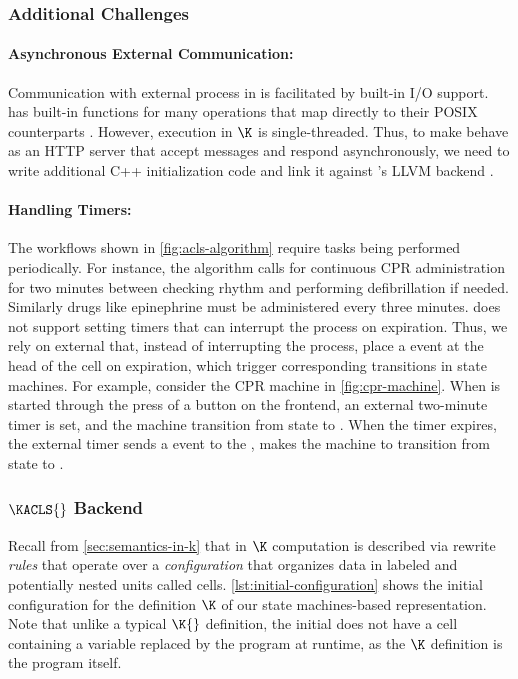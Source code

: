 \subsubsection{Additional Challenges}

\paragraph{Asynchronous External Communication:}
Communication with external process in \K{} is facilitated
by built-in I/O support. \K{} has built-in
functions for many operations that map directly to their
POSIX counterparts \cite{KFrameworkIOUrl}. However,
execution in $\K$ is single-threaded. Thus, to make \K{}
behave as an HTTP \cite{HTTPUrl} server that accept messages and respond asynchronously,
we need to write additional C++ initialization code and link it against
\K's LLVM backend \cite{KFrameworkBackendsUrl}.

\paragraph{Handling Timers:}
The \ACLS{} workflows shown in \autoref{fig:acls-algorithm} require
tasks being performed periodically. For instance, the algorithm
calls for continuous CPR administration for two minutes
between checking rhythm and performing defibrillation if needed.
Similarly drugs like epinephrine must be administered every three minutes.
\K{} does not support setting timers that can interrupt the \K{} process
on expiration. Thus, we rely on external  that, instead
of interrupting the \K{} process, place a  event
at the head of the  cell on expiration, which
trigger corresponding transitions in state machines. For example,
consider the CPR machine in \autoref{fig:cpr-machine}. When
\CPR{} is started through the press of a button on the frontend,
an external two-minute timer is set, and the machine
transition from state  to .
When the timer expires, the external timer sends a 
event to the \K{}, makes the \CPR{} machine to transition from
state  to .

\subsubsection{$\KACLS{}$ Backend}
Recall from \autoref{sec:semantics-in-k} that in $\K$ computation
is described via rewrite \emph{rules} that operate over a \emph{configuration}
that organizes data in labeled and potentially nested units called cells.
\autoref{lst:initial-configuration} shows the initial configuration for
the definition $\K$ of our state machines-based representation.
Note that unlike a typical $\K{}$ definition, the initial 
does not have a  cell containing a  variable
replaced by the program \AST{} at runtime, as the $\K$ definition is the
program itself.

